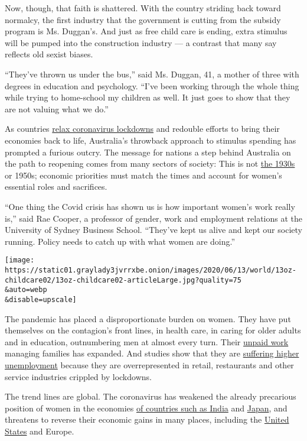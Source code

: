 Now, though, that faith is shattered. With the country striding back
toward normalcy, the first industry that the government is cutting from
the subsidy program is Ms. Duggan's. And just as free child care is
ending, extra stimulus will be pumped into the construction industry ---
a contrast that many say reflects old sexist biases.

``They've thrown us under the bus,'' said Ms. Duggan, 41, a mother of
three with degrees in education and psychology. ``I've been working
through the whole thing while trying to home-school my children as well.
It just goes to show that they are not valuing what we do.''

As countries
\href{https://www.nytimes3xbfgragh.onion/2020/06/09/world/coronavirus-reopenings.html}{relax
coronavirus lockdowns} and redouble efforts to bring their economies
back to life, Australia's throwback approach to stimulus spending has
prompted a furious outcry. The message for nations a step behind
Australia on the path to reopening comes from many sectors of society:
This is not
\href{https://rooseveltinstitute.org/wpa-flawed-model-women-inspiration-progress/}{the
1930s} or 1950s; economic priorities must match the times and account
for women's essential roles and sacrifices.

``One thing the Covid crisis has shown us is how important women's work
really is,'' said Rae Cooper, a professor of gender, work and employment
relations at the University of Sydney Business School. ``They've kept us
alive and kept our society running. Policy needs to catch up with what
women are doing.''

\texttt{[image: https://static01.graylady3jvrrxbe.onion/images/2020/06/13/world/13oz-childcare02/13oz-childcare02-articleLarge.jpg?quality=75\\\&auto=webp\\\&disable=upscale]}

The pandemic has placed a disproportionate burden on women. They have
put themselves on the contagion's front lines, in health care, in caring
for older adults and in education, outnumbering men at almost every
turn. Their
\href{https://www.nytimes3xbfgragh.onion/2020/05/20/us/women-economy-jobs-coronavirus-gender.html}{unpaid
work} managing families has expanded. And studies show that they are
\href{https://nwlc-ciw49tixgw5lbab.stackpathdns.com/wp-content/uploads/2020/05/Jobs-Day-April-Factsheet.pdf}{suffering
higher unemployment} because they are overrepresented in retail,
restaurants and other service industries crippled by lockdowns.

The trend lines are global. The coronavirus has weakened the already
precarious position of women in the economies
\href{https://www.nytimes3xbfgragh.onion/2020/06/09/world/asia/india-coronavirus-women-economy.html}{of
countries such as India} and
\href{https://www.smh.com.au/business/markets/shock-absorbers-japanese-women-bear-brunt-of-recession-as-pandemic-unravels-abe-s-womenomics-20200612-p551wt.html}{Japan},
and threatens to reverse their economic gains in many places, including
the
\href{https://www.nytimes3xbfgragh.onion/2020/06/03/business/economy/coronavirus-working-women.html}{United
States} and Europe.

